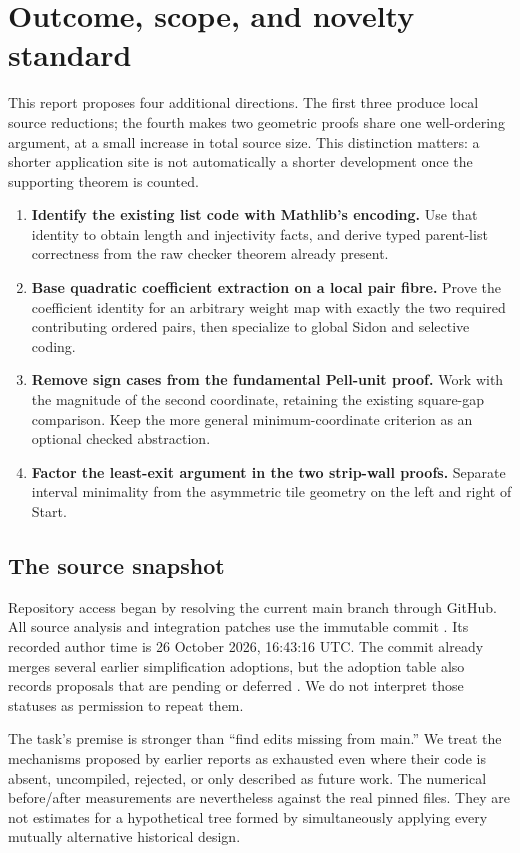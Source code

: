 \section{Outcome, scope, and novelty standard}

This report proposes four additional directions. The first three produce
local source reductions; the fourth makes two geometric proofs share one
well-ordering argument, at a small increase in total source size. This
distinction matters: a shorter application site is not automatically a
shorter development once the supporting theorem is counted.

\begin{enumerate}
\item \textbf{Identify the existing list code with Mathlib's encoding.}
Use that identity to obtain length and injectivity facts, and derive typed
parent-list correctness from the raw checker theorem already present.
\item \textbf{Base quadratic coefficient extraction on a local pair fibre.}
Prove the coefficient identity for an arbitrary weight map with exactly the
two required contributing ordered pairs, then specialize to global Sidon and
selective coding.
\item \textbf{Remove sign cases from the fundamental Pell-unit proof.}
Work with the magnitude of the second coordinate, retaining the existing
square-gap comparison. Keep the more general minimum-coordinate
criterion as an optional checked abstraction.
\item \textbf{Factor the least-exit argument in the two strip-wall proofs.}
Separate interval minimality from the asymmetric tile geometry on the left
and right of Start.
\end{enumerate}

\subsection{The source snapshot}

Repository access began by resolving the current main branch through GitHub.
All source analysis and integration patches use the immutable commit
\sourcecommit. Its recorded author time is 26 October 2026, 16:43:16 UTC.
The commit already merges several earlier simplification adoptions, but the
adoption table also records proposals that are pending or deferred
\cite{sourcepin,adoption}. We do not interpret those statuses as permission
to repeat them.

The task's premise is stronger than ``find edits missing from main.'' We
treat the mechanisms proposed by earlier reports as exhausted even where
their code is absent, uncompiled, rejected, or only described as future
work. The numerical before/after measurements are nevertheless against the
real pinned files. They are not estimates for a hypothetical tree formed by
simultaneously applying every mutually alternative historical design.

